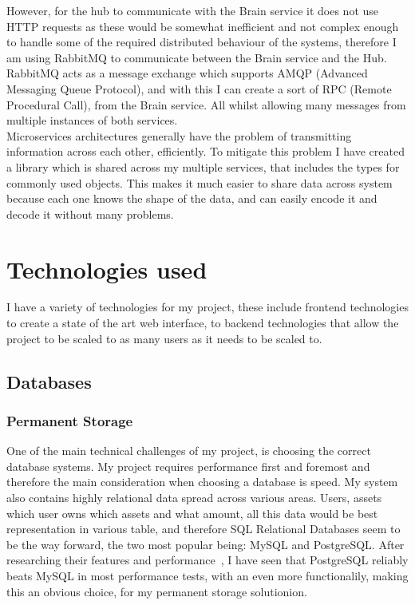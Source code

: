 \documentclass[titlepage]{article}
\begin{document}
However, for the hub to communicate with the Brain service it does not use HTTP requests as these would be somewhat inefficient and not complex enough to handle some of the required distributed behaviour of the systems, therefore I am using RabbitMQ to communicate between the Brain service and the Hub. RabbitMQ acts as a message exchange which supports AMQP (Advanced Messaging Queue Protocol), and with this I can create a sort of RPC (Remote Procedural Call), from the Brain service. All whilst allowing many messages from multiple instances of both services. \\

Microservices architectures generally have the problem of transmitting information across each other, efficiently. To mitigate this problem I have created a library which is shared across my multiple services, that includes the types for commonly used objects. This makes it much easier to share data across system because each one knows the shape of the data, and can easily encode it and decode it without many problems.

\pagebreak
\section{Technologies used}
I have a variety of technologies for my project, these include frontend technologies to create a state of the art web interface, to backend technologies that allow the project to be scaled to as many users as it needs to be scaled to. \\

\subsection{Databases}

\subsubsection{Permanent Storage}
One of the main technical challenges of my project, is choosing the correct database systems. My project requires performance first and foremost and therefore the main consideration when choosing a database is speed. My system also contains highly relational data spread across various areas. Users, assets which user owns which assets and what amount, all this data would be best representation in various table, and therefore SQL Relational Databases seem to be the way forward, the two most popular being: MySQL and PostgreSQL. After researching their features and performance~\cite{postgres_vs_mysql}, I have seen that PostgreSQL reliably beats MySQL in most performance tests, with an even more functionalily, making this an obvious choice, for my permanent storage solutionion. \\
\end{document}
